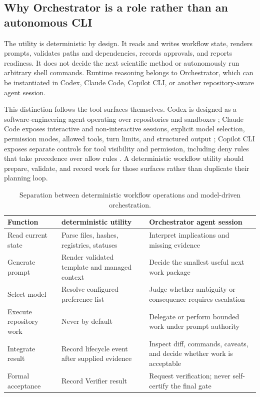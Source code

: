 \documentclass[11pt,a4paper]{article}
\newcommand{\code}[1]{\texttt{\detokenize{#1}}}
\begin{document}
\subsection{Why Orchestrator is a role rather than an autonomous CLI}

The \code{aw} utility is deterministic by design. It reads and writes workflow state, renders prompts, validates paths and dependencies, records approvals, and reports readiness. It does not decide the next scientific method or autonomously run arbitrary shell commands. Runtime reasoning belongs to Orchestrator, which can be instantiated in Codex, Claude Code, Copilot CLI, or another repository-aware agent session.

This distinction follows the tool surfaces themselves. Codex is designed as a software-engineering agent operating over repositories and sandboxes \cite{openaicodex2025}; Claude Code exposes interactive and non-interactive sessions, explicit model selection, permission modes, allowed tools, turn limits, and structured output \cite{anthropicclaudecodecli2025}; Copilot CLI exposes separate controls for tool visibility and permission, including deny rules that take precedence over allow rules \cite{githubcopilotcli2026}. A deterministic workflow utility should prepare, validate, and record work for those surfaces rather than duplicate their planning loop.

\begin{table}[H]
\centering
\caption{Separation between deterministic workflow operations and model-driven orchestration.}
\begin{tabularx}{\textwidth}{P{0.23\textwidth}Y Y}
\toprule
\textbf{Function} & \textbf{\code{aw} deterministic utility} & \textbf{Orchestrator agent session} \\
\midrule
Read current state & Parse files, hashes, registries, statuses & Interpret implications and missing evidence \\
Generate prompt & Render validated template and managed context & Decide the smallest useful next work package \\
Select model & Resolve configured preference list & Judge whether ambiguity or consequence requires escalation \\
Execute repository work & Never by default & Delegate or perform bounded work under prompt authority \\
Integrate result & Record lifecycle event after supplied evidence & Inspect diff, commands, caveats, and decide whether work is acceptable \\
Formal acceptance & Record Verifier result & Request verification; never self-certify the final gate \\
\bottomrule
\end{tabularx}
\end{table}
\end{document}
